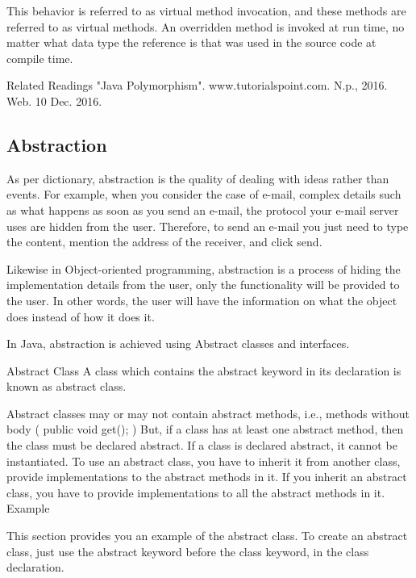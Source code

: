 This behavior is referred to as virtual method invocation, and these methods are referred to as virtual methods. An overridden method is invoked at run time, no matter what data type the reference is that was used in the source code at compile time.

Related Readings
"Java Polymorphism". www.tutorialspoint.com. N.p., 2016. Web. 10 Dec. 2016.

\subsection{Abstraction}

As per dictionary, abstraction is the quality of dealing with ideas rather than events. For example, when you consider the case of e-mail, complex details such as what happens as soon as you send an e-mail, the protocol your e-mail server uses are hidden from the user. Therefore, to send an e-mail you just need to type the content, mention the address of the receiver, and click send.

Likewise in Object-oriented programming, abstraction is a process of hiding the implementation details from the user, only the functionality will be provided to the user. In other words, the user will have the information on what the object does instead of how it does it.

In Java, abstraction is achieved using Abstract classes and interfaces.

Abstract Class
A class which contains the abstract keyword in its declaration is known as abstract class.

Abstract classes may or may not contain abstract methods, i.e., methods without body ( public void get(); )
But, if a class has at least one abstract method, then the class must be declared abstract.
If a class is declared abstract, it cannot be instantiated.
To use an abstract class, you have to inherit it from another class, provide implementations to the abstract methods in it.
If you inherit an abstract class, you have to provide implementations to all the abstract methods in it.
Example

This section provides you an example of the abstract class. To create an abstract class, just use the abstract keyword before the class keyword, in the class declaration.

